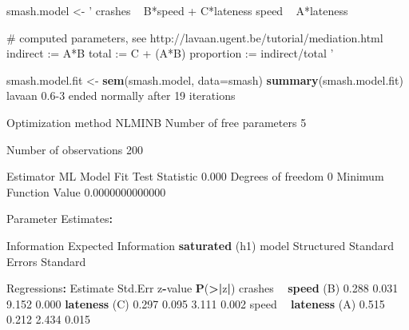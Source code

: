 \documentclass[]{article}
\newenvironment{Shaded}{\begin{snugshade}}{\end{snugshade}}
\newcommand{\DataTypeTok}[1]{\textcolor[rgb]{0.13,0.29,0.53}{#1}}
\newcommand{\DecValTok}[1]{\textcolor[rgb]{0.00,0.00,0.81}{#1}}
\newcommand{\ErrorTok}[1]{\textcolor[rgb]{0.64,0.00,0.00}{\textbf{#1}}}
\newcommand{\FloatTok}[1]{\textcolor[rgb]{0.00,0.00,0.81}{#1}}
\newcommand{\KeywordTok}[1]{\textcolor[rgb]{0.13,0.29,0.53}{\textbf{#1}}}
\newcommand{\NormalTok}[1]{#1}
\newcommand{\OperatorTok}[1]{\textcolor[rgb]{0.81,0.36,0.00}{\textbf{#1}}}
\newcommand{\StringTok}[1]{\textcolor[rgb]{0.31,0.60,0.02}{#1}}
\begin{document}
\begin{Shaded}
\begin{Highlighting}[]
\NormalTok{smash.model <-}\StringTok{ '}
\StringTok{  crashes ~ B*speed + C*lateness}
\StringTok{  speed ~ A*lateness}

\StringTok{  # computed parameters, see http://lavaan.ugent.be/tutorial/mediation.html}
\StringTok{  indirect := A*B}
\StringTok{  total := C + (A*B)}
\StringTok{  proportion := indirect/total}
\StringTok{'}

\NormalTok{smash.model.fit <-}\StringTok{ }\KeywordTok{sem}\NormalTok{(smash.model, }\DataTypeTok{data=}\NormalTok{smash)}
\KeywordTok{summary}\NormalTok{(smash.model.fit)}
\NormalTok{lavaan }\FloatTok{0.6}\DecValTok{-3}\NormalTok{ ended normally after }\DecValTok{19}\NormalTok{ iterations}

\NormalTok{  Optimization method                           NLMINB}
\NormalTok{  Number of free parameters                          }\DecValTok{5}

\NormalTok{  Number of observations                           }\DecValTok{200}

\NormalTok{  Estimator                                         ML}
\NormalTok{  Model Fit Test Statistic                       }\FloatTok{0.000}
\NormalTok{  Degrees of freedom                                 }\DecValTok{0}
\NormalTok{  Minimum Function Value               }\FloatTok{0.0000000000000}

\NormalTok{Parameter Estimates}\OperatorTok{:}

\StringTok{  }\NormalTok{Information                                 Expected}
\NormalTok{  Information }\KeywordTok{saturated}\NormalTok{ (h1) model          Structured}
\NormalTok{  Standard Errors                             Standard}

\NormalTok{Regressions}\OperatorTok{:}
\StringTok{                   }\NormalTok{Estimate  Std.Err  z}\OperatorTok{-}\NormalTok{value  }\KeywordTok{P}\NormalTok{(}\OperatorTok{>}\ErrorTok{|}\NormalTok{z}\OperatorTok{|}\NormalTok{)}
\NormalTok{  crashes }\OperatorTok{~}\StringTok{                                           }
\StringTok{    }\KeywordTok{speed}\NormalTok{      (B)    }\FloatTok{0.288}    \FloatTok{0.031}    \FloatTok{9.152}    \FloatTok{0.000}
    \KeywordTok{lateness}\NormalTok{   (C)    }\FloatTok{0.297}    \FloatTok{0.095}    \FloatTok{3.111}    \FloatTok{0.002}
\NormalTok{  speed }\OperatorTok{~}\StringTok{                                             }
\StringTok{    }\KeywordTok{lateness}\NormalTok{   (A)    }\FloatTok{0.515}    \FloatTok{0.212}    \FloatTok{2.434}    \FloatTok{0.015}


\end{Highlighting}
\end{Shaded}
\end{document}
